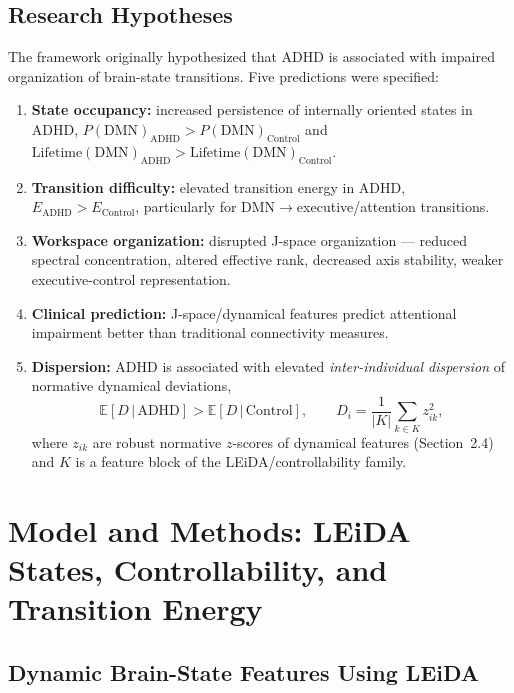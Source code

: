 \documentclass{article}
\begin{document}
\subsection{Research Hypotheses}

The framework originally hypothesized that ADHD is associated with impaired organization of brain-state transitions. Five predictions were specified:

\begin{enumerate}
\item \textbf{State occupancy:} increased persistence of internally oriented states in ADHD, $P(\mathrm{DMN})_{\mathrm{ADHD}}>P(\mathrm{DMN})_{\mathrm{Control}}$ and $\mathrm{Lifetime}(\mathrm{DMN})_{\mathrm{ADHD}}>\mathrm{Lifetime}(\mathrm{DMN})_{\mathrm{Control}}$.
\item \textbf{Transition difficulty:} elevated transition energy in ADHD, $E_{\mathrm{ADHD}}>E_{\mathrm{Control}}$, particularly for DMN$\to$executive/attention transitions.
\item \textbf{Workspace organization:} disrupted J-space organization --- reduced spectral concentration, altered effective rank, decreased axis stability, weaker executive-control representation.
\item \textbf{Clinical prediction:} J-space/dynamical features predict attentional impairment better than traditional connectivity measures.
\item \textbf{Dispersion:} ADHD is associated with elevated \emph{inter-individual dispersion} of normative dynamical deviations,
\begin{equation}
\mathbb{E}[D\,|\,\mathrm{ADHD}]>\mathbb{E}[D\,|\,\mathrm{Control}],
\qquad D_i=\frac{1}{|K|}\sum_{k\in K} z_{ik}^2,
\end{equation}
where $z_{ik}$ are robust normative $z$-scores of dynamical features (Section~2.4) and $K$ is a feature block of the LEiDA/controllability family.
\end{enumerate}

\section{Model and Methods: LEiDA States, Controllability, and Transition Energy}

\subsection{Dynamic Brain-State Features Using LEiDA}
\end{document}
